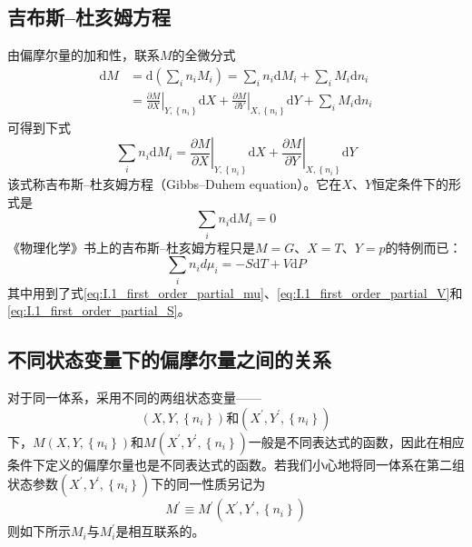 \documentclass[main.tex]{subfiles}
\begin{document}
\subsection{吉布斯--杜亥姆方程}
由偏摩尔量的加和性，联系$M$的全微分式
\begin{align*}
    \mathrm{d}M & =\mathrm{d}\left(\sum_in_iM_i\right)=\sum_in_i\mathrm{d}M_i+\sum_iM_i\mathrm{d}n_i                                                                                                \\
                & =\left.\frac{\partial M}{\partial X}\right|_{Y,\left\{n_i\right\}}\mathrm{d}X+\left.\frac{\partial M}{\partial Y}\right|_{X,\left\{n_i\right\}}\mathrm{d}Y+\sum_iM_i\mathrm{d}n_i
\end{align*}
可得到下式
\begin{equation}\label{eq:II.2_Gibbs_Duhem_eq}
    \sum_in_i\mathrm{d}M_i=\left.\frac{\partial M}{\partial X}\right|_{Y,\left\{n_i\right\}}\mathrm{d}X+\left.\frac{\partial M}{\partial Y}\right|_{X,\left\{n_i\right\}}\mathrm{d}Y
\end{equation}
该式称吉布斯--杜亥姆方程（Gibbs--Duhem equation）。它在$X$、$Y$恒定条件下的形式是
\begin{equation}\label{eq:II.2_Gibbs_Duhem_eq_XYConst}
    \sum_in_i\mathrm{d}M_i=0
\end{equation}
《物理化学》书上的吉布斯--杜亥姆方程只是$M=G$、$X=T$、$Y=p$的特例而已：
\begin{equation}\label{eq:II.2_Gibbs_Duhem_eq_for_G}
    \sum_in_id\mu_i=-S\mathrm{d}T+V\mathrm{d}P
\end{equation}
其中用到了式\eqref{eq:I.1_first_order_partial_mu}、\eqref{eq:I.1_first_order_partial_V}和\eqref{eq:I.1_first_order_partial_S}。


\subsection{不同状态变量下的偏摩尔量之间的关系}
对于同一体系，采用不同的两组状态变量——
\[\left(X,Y,\left\{n_i\right\}\right)\text{和}\left(X^\prime,Y^\prime,\left\{n_i\right\}\right)\]
下，$M\left(X,Y,\left\{n_i\right\}\right)$和$M\left(X^\prime, Y^\prime,\left\{n_i\right\}\right)$一般是不同表达式的函数，因此在相应条件下定义的偏摩尔量也是不同表达式的函数。若我们小心地将同一体系在第二组状态参数$\left(X^\prime,Y^\prime,\left\{n_i\right\}\right)$下的同一性质另记为
\[M^\prime\equiv M^\prime\left(X^\prime,Y^\prime,\left\{n_i\right\}\right)\]
则如下所示$M_i$与$M_i^\prime$是相互联系的。
\end{document}
